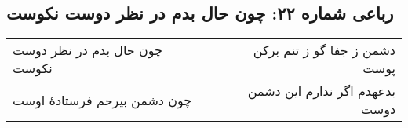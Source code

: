 \begin{center}
\section*{رباعی شماره ۲۲: چون حال بدم در نظر دوست نکوست}
\label{sec:022}
\begin{longtable}{l p{0.5cm} r}
چون حال بدم در نظر دوست نکوست
&&
دشمن ز جفا گو ز تنم برکن پوست
\\
چون دشمن بیرحم فرستادهٔ اوست
&&
بدعهدم اگر ندارم این دشمن دوست
\\
\end{longtable}
\end{center}
